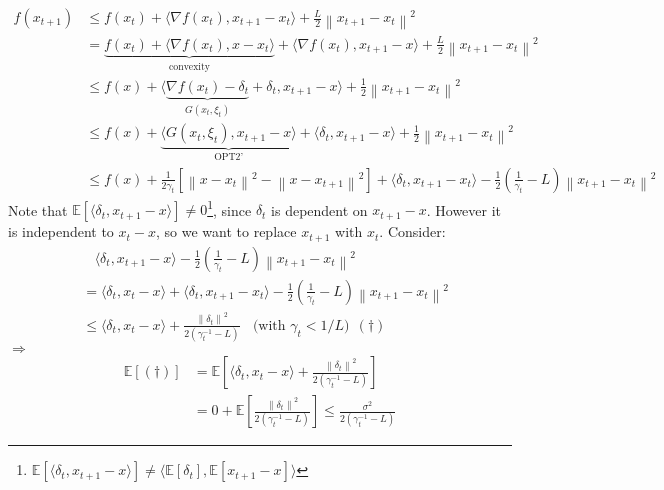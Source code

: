 \documentclass[a4paper, 11pt]{article}
\begin{document}
\begin{equation}
  \begin{split}
    f(x_{t+1}) &\leq f(x_t) + \langle \nabla f(x_t), x_{t+1}-x_t \rangle + \frac{L}{2} \left\|x_{t+1}-x_t\right\|^2\\
    &= \underbrace{f(x_t) + \langle \nabla f(x_t), x-x_t \rangle}_{\text{convexity}} + \langle \nabla f(x_t), x_{t+1}-x \rangle + \frac{L}{2} \left\|x_{t+1}-x_t\right\|^2\\
    &\leq f(x) + \langle  \underbrace{\nabla f(x_t)-\delta_t}_{G(x_t, \xi_t)} + \delta_t, x_{t+1}-x \rangle+\frac{1}{2} \left\|x_{t+1}-x_t\right\|^2\\
    & \leq f(x) + \underbrace{\langle  G(x_t, \xi_t), x_{t+1}-x \rangle}_{\text{OPT2'}}+ \langle \delta_t, x_{t+1}-x \rangle+\frac{1}{2} \left\|x_{t+1}-x_t\right\|^2\\
    & \leq f(x) + \frac{1}{2\gamma_t} \left[\left\|x-x_t\right\|^2 - \left\|x-x_{t+1}\right\|^2\right] + \langle \delta_t, x_{t+1}-x_t \rangle - \frac{1}{2}\left(\frac{1}{\gamma_t}-L\right)\left\|x_{t+1}-x_t\right\|^2
  \end{split}
\end{equation}
Note that $\mathbb{E}\left[\langle \delta_t, x_{t+1}-x \rangle\right]\ne 0$\footnote{$\mathbb{E}\left[\langle \delta_t, x_{t+1}-x \rangle\right] \ne \langle \mathbb{E}\left[\delta_t\right], \mathbb{E}\left[x_{t+1}-x\right] \rangle$}, since $\delta_t$ is dependent on $x_{t+1}-x$. However it is independent to $x_t -x$, so we want to replace $x_{t+1}$ with $x_t$.  
Consider:
\begin{equation}
  \begin{split}
    &~~~~\langle \delta_t, x_{t+1}-x \rangle - \frac{1}{2} \left(\frac{1}{\gamma_t}-L\right)\left\|x_{t+1}-x_t\right\|^2 \\
    &=\langle \delta_t, x_{t}-x \rangle + \langle \delta_t, x_{t+1}-x_t \rangle - \frac{1}{2} \left(\frac{1}{\gamma_t}-L\right)\left\|x_{t+1}-x_t\right\|^2\\
    &\leq  \langle \delta_t, x_{t}-x \rangle + \frac{\left\|\delta_t\right\|^2}{2(\gamma_t^{-1}-L)}~~~~\text{(with $\gamma_t < 1/L$)}~~(\dag)
  \end{split}
\end{equation}
$\Rightarrow$
\begin{equation}
  \begin{split}
    \mathbb{E}\left[(\dag)\right] &= \mathbb{E}\left[\langle \delta_t, x_{t}-x \rangle + \frac{\left\|\delta_t\right\|^2}{2(\gamma_t^{-1}-L)}\right] \\
    &= 0 + \mathbb{E}\left[ \frac{\left\|\delta_t\right\|^2}{2(\gamma_t^{-1}-L)}\right] \leq \frac{\sigma^2}{2(\gamma_t^{-1}-L)}
  \end{split}
\end{equation}
\end{document}
